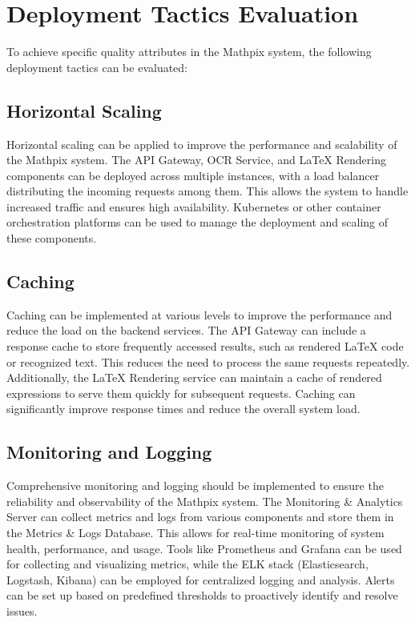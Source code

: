 \documentclass{article}
\begin{document}
\section{Deployment Tactics Evaluation}
To achieve specific quality attributes in the Mathpix system, the following deployment tactics can be evaluated:

\subsection{Horizontal Scaling}
Horizontal scaling can be applied to improve the performance and scalability of the Mathpix system. The API Gateway, OCR Service, and LaTeX Rendering components can be deployed across multiple instances, with a load balancer distributing the incoming requests among them. This allows the system to handle increased traffic and ensures high availability. Kubernetes or other container orchestration platforms can be used to manage the deployment and scaling of these components.

\subsection{Caching}
Caching can be implemented at various levels to improve the performance and reduce the load on the backend services. The API Gateway can include a response cache to store frequently accessed results, such as rendered LaTeX code or recognized text. This reduces the need to process the same requests repeatedly. Additionally, the LaTeX Rendering service can maintain a cache of rendered expressions to serve them quickly for subsequent requests. Caching can significantly improve response times and reduce the overall system load.

\subsection{Monitoring and Logging}
Comprehensive monitoring and logging should be implemented to ensure the reliability and observability of the Mathpix system. The Monitoring \& Analytics Server can collect metrics and logs from various components and store them in the Metrics \& Logs Database. This allows for real-time monitoring of system health, performance, and usage. Tools like Prometheus and Grafana can be used for collecting and visualizing metrics, while the ELK stack (Elasticsearch, Logstash, Kibana) can be employed for centralized logging and analysis. Alerts can be set up based on predefined thresholds to proactively identify and resolve issues.
\end{document}
